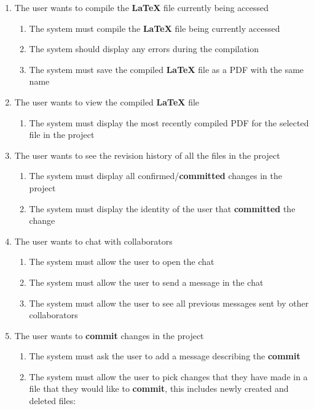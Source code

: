 \documentclass[12pt, titlepage]{article}
\begin{document}
\begin{enumerate}[{BE}1.]
\begin{enumerate}[resume*]
		\end{enumerate}
		\item The user wants to compile the \textbf{LaTeX} file currently being accessed
		\begin{enumerate}[resume*]
			\item The system must compile the \textbf{LaTeX} file being currently accessed
			\item The system should display any errors during the compilation
			\item The system must save the compiled \textbf{LaTeX} file as a PDF with the same name
		\end{enumerate}
		\item The user wants to view the compiled \textbf{LaTeX} file
		\begin{enumerate}[resume*]
			\item The system must display the most recently compiled PDF for the selected file in the project
		\end{enumerate}
		\item The user wants to see the revision history of all the files in the project
		\begin{enumerate}[resume*]
			\item The system must display all confirmed/\textbf{committed} changes in the project
			\item The system must display the identity of the user that \textbf{committed} the change
		\end{enumerate}
		\item The user wants to chat with collaborators
		\begin{enumerate}[resume*]
			\item The system must allow the user to open the chat
			\item The system must allow the user to send a message in the chat
			\item The system must allow the user to see all previous messages sent by other collaborators
		\end{enumerate}
		\item The user wants to \textbf{commit} changes in the project
		\begin{enumerate}[resume*]
			\item The system must ask the user to add a message describing the \textbf{commit}
			\item The system must allow the user to pick changes that they have made in a file that they would like to \textbf{commit}, this includes newly created and deleted files:\\
			

\end{enumerate}
\end{enumerate}
\end{document}
